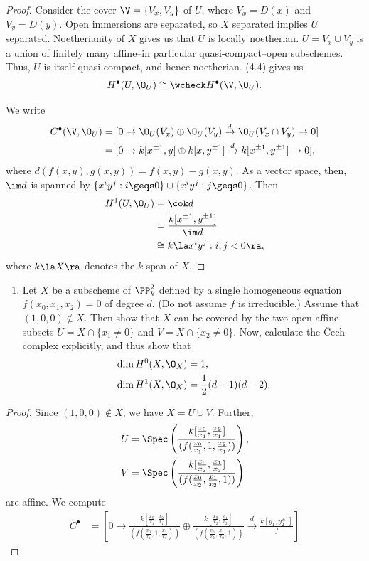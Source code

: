 \documentclass[12pt]{amsart}
\begin{document}
\begin{proof}
  Consider the cover $\V= \{V_x,V_y\}$ of $U$, where $V_x = D(x)$ and $V_y=D(y)$.
  Open immersions are separated, so $X$ separated implies $U$ separated.
  Noetherianity of $X$ gives us that $U$ is locally noetherian.
  $U=V_x\cup V_y$ is a union of finitely many affine--in particular quasi-compact--open subschemes.
  Thus, $U$ is itself quasi-compact, and hence noetherian.
  (4.4) gives us
  \begin{align*}
    H^\bullet(U,\O_U)\cong \wcheck H^\bullet(\V,\O_U).
  \end{align*}

  We write
  \begin{align*}
    C^\bullet(\V,\O_U)
    &= [0\to \O_U(V_x)\oplus \O_U(V_y)\xrightarrow{d} \O_U(V_x\cap V_y)\to 0] \\
    &= [0\to k[x^{\pm 1},y]\oplus k[x,y^{\pm1}]\xrightarrow{d}k[x^{\pm1},y^{\pm1}]\to 0],
  \end{align*}
  where $d(f(x,y),g(x,y)) = f(x,y)-g(x,y)$.
  As a vector space, then, $\im d$ is spanned by $\{x^iy^j:i\geqs 0\}\cup \{x^iy^j:j\geqs 0\}$.
  Then
  \begin{align*}
    H^1(U,\O_U) 
    &=\cok d \\
    &= \frac{k[x^{\pm1},y^{\pm1}]}{\im d} \\
    &\cong k\la x^iy^j :i,j<0\ra,
  \end{align*}
  where $k\la X\ra$ denotes the $k$-span of $X$.
\end{proof}

\begin{enumerate}
  \item[4.7.] {
      Let $X$ be a subscheme of $\PP_k^2$ defined by a single homogeneous equation $f(x_0,x_1,x_2)=0$ of degree $d$.
      (Do not assume $f$ is irreducible.)
      Assume that $(1,0,0)\notin X$.
      Then show that $X$ can be covered by the two open affine subsets $U=X\cap \{x_1\neq 0\}$ and $V=X\cap \{x_2\neq 0\}$.
      Now, calculate the \v{C}ech complex explicitly, and thus show that
      \begin{align*}
        &\dim H^0(X,\O_X)=1, \\
        &\dim H^1(X,\O_X)=\frac12(d-1)(d-2).
      \end{align*}
    }
\end{enumerate}

\begin{proof}
  Since $(1,0,0)\notin X$, we have $X=U\cup V$.
  Further, 
  \begin{align*}
    U &= \Spec\left(\frac{k[\frac{x_0}{x_1},\frac{x_2}{x_1}]}{(f(\frac{x_0}{x_1},1,\frac{x_2}{x_1}))}\right), \\
    V &= \Spec\left(\frac{k[\frac{x_0}{x_2},\frac{x_1}{x_2}]}{(f(\frac{x_0}{x_2},\frac{x_1}{x_2},1))}\right)
  \end{align*}
  are affine.
  We compute
  \begin{align*}
    C^\bullet &= [0\to \frac{k[\frac{x_0}{x_1},\frac{x_2}{x_1}]}{(f(\frac{x_0}{x_1},1,\frac{x_2}{x_1}))}\oplus \frac{k[\frac{x_0}{x_2},\frac{x_1}{x_2}]}{(f(\frac{x_0}{x_2},\frac{x_1}{x_2},1))}\xrightarrow{d} \frac{k[y_1,y_2^{\pm1}]}{f} ]
  \end{align*}
\end{proof}
\end{document}
